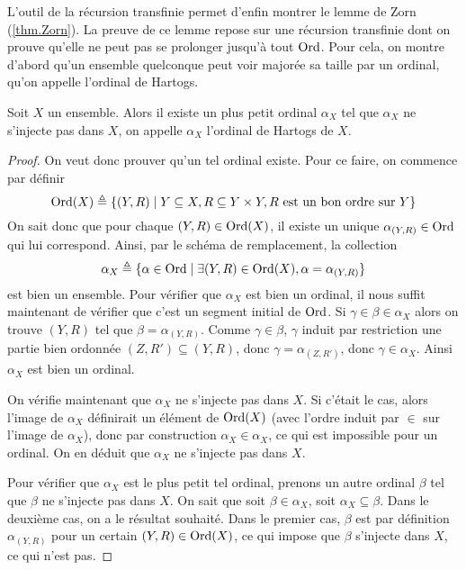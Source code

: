 L'outil de la récursion transfinie permet d'enfin montrer le lemme de Zorn
(\cref{thm.Zorn}). La preuve de ce lemme repose sur une récursion transfinie
dont on prouve qu'elle ne peut pas se prolonger jusqu'à tout $\operatorname{Ord}$. Pour cela,
on montre d'abord qu'un ensemble quelconque peut voir majorée sa taille par un
ordinal, qu'on appelle l'ordinal de Hartogs.

\begin{definition}
  Soit $X$ un ensemble. Alors il existe un plus petit ordinal $\alpha_X$ tel
  que $\alpha_X$ ne s'injecte pas dans $X$, on appelle $\alpha_X$ l'ordinal
  de Hartogs de $X$.
\end{definition}

\begin{proof}
  On veut donc prouver qu'un tel ordinal existe. Pour ce faire, on commence par
  définir
  \[\operatorname{Ord}(X) \triangleq \{(Y,R)\mid
  Y\subseteq X, R\subseteq Y\times Y, R\text{ est un bon ordre sur }Y\}\]
  On sait donc que pour chaque $(Y,R)\in\operatorname{Ord}(X)$, il existe un unique
  $\alpha_{(Y,R)}\in\operatorname{Ord}$ qui lui correspond. Ainsi, par le schéma de
  remplacement, la collection
  \[\alpha_X \triangleq \{\alpha \in \operatorname{Ord}\mid \exists (Y,R) \in \operatorname{Ord}(X),
  \alpha = \alpha_{(Y,R)}\}\]
  est bien un ensemble. Pour vérifier que $\alpha_X$ est bien un ordinal, il
  nous suffit maintenant de vérifier que c'est un segment initial de $\operatorname{Ord}$.
  Si $\gamma\in\beta\in\alpha_X$ alors on trouve $(Y,R)$ tel que
  $\beta = \alpha_{(Y,R)}$. Comme $\gamma\in\beta$, $\gamma$ induit
  par restriction une partie bien ordonnée $(Z,R')\subseteq (Y,R)$, donc
  $\gamma = \alpha_{(Z,R')}$, donc $\gamma\in \alpha_X$. Ainsi $\alpha_X$ est
  bien un ordinal.

  On vérifie maintenant que $\alpha_X$ ne s'injecte pas dans $X$. Si c'était le
  cas, alors l'image de $\alpha_X$ définirait un élément de $\operatorname{Ord}(X)$ (avec
  l'ordre induit par $\in$ sur l'image de $\alpha_X$), donc par construction
  $\alpha_X\in\alpha_X$, ce qui est impossible pour un ordinal. On en déduit
  que $\alpha_X$ ne s'injecte pas dans $X$.

  Pour vérifier que $\alpha_X$ est le plus petit tel ordinal, prenons un autre
  ordinal $\beta$ tel que $\beta$ ne s'injecte pas dans $X$. On sait que
  soit $\beta \in \alpha_X$, soit $\alpha_X\subseteq \beta$. Dans le deuxième
  cas, on a le résultat souhaité. Dans le premier cas, $\beta$ est par
  définition $\alpha_{(Y,R)}$ pour un certain $(Y,R)\in\operatorname{Ord}(X)$, ce qui impose
  que $\beta$ s'injecte dans $X$, ce qui n'est pas.
\end{proof}

